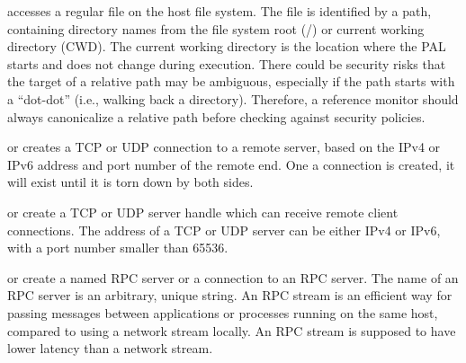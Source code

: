 \begin{compactitem}

\item {} accesses a regular file on the host file system.
The file is identified by a path,
containing directory names from the file system root (/) or current working directory (CWD).
The current working directory is the location where the PAL starts and does not change during execution.
There could be security risks
that the target of a relative path may be ambiguous, especially if the path starts with a ``dot-dot'' (i.e., walking back a directory).
Therefore, a reference monitor should always canonicalize a relative path before checking against security policies.

\item {} or  creates a TCP or UDP connection to a remote server,
based on the IPv4 or IPv6 address and port number of the remote end.
One a connection is created,
it will exist until it is torn down by both sides.

\item {} or  create a TCP or UDP server handle which can receive remote client connections.
The address of a TCP or UDP server can be either IPv4 or IPv6, with a port number smaller than 65536.

\item {} or  create a named RPC server or a connection to an RPC server.
The name of an RPC server is an arbitrary, unique string.
An RPC stream is an efficient way for passing messages between applications or processes
running on the same host,
compared to using a network stream locally.
An RPC stream is supposed to have lower latency than a network stream.


\end{compactitem}



